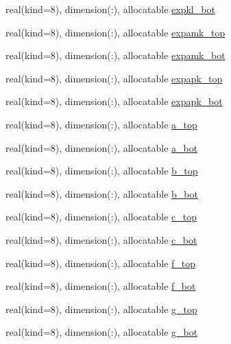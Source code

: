 \begin{DoxyCompactItemize}
\item 
real(kind=8), dimension(\+:), allocatable \hyperlink{namespacecanopy__layer__coms_a97beb2506887f723e41a70d5f75b6a91}{expkl\+\_\+bot}
\item 
real(kind=8), dimension(\+:), allocatable \hyperlink{namespacecanopy__layer__coms_abb449a0f8ffd39c8d2e8f880f6e430ab}{expamk\+\_\+top}
\item 
real(kind=8), dimension(\+:), allocatable \hyperlink{namespacecanopy__layer__coms_a97f0e913b53dc4ee87bae6d9efe52192}{expamk\+\_\+bot}
\item 
real(kind=8), dimension(\+:), allocatable \hyperlink{namespacecanopy__layer__coms_afe005bb965214174ac674496f52449f8}{expapk\+\_\+top}
\item 
real(kind=8), dimension(\+:), allocatable \hyperlink{namespacecanopy__layer__coms_ab65f7a83a69f569d877187dabb799a7d}{expapk\+\_\+bot}
\item 
real(kind=8), dimension(\+:), allocatable \hyperlink{namespacecanopy__layer__coms_acef66a2794edd028cbebb25b81c94582}{a\+\_\+top}
\item 
real(kind=8), dimension(\+:), allocatable \hyperlink{namespacecanopy__layer__coms_a363ffecb6cfbea0e04ccff6048870913}{a\+\_\+bot}
\item 
real(kind=8), dimension(\+:), allocatable \hyperlink{namespacecanopy__layer__coms_af986529a5d36d7c69ccaf9af08e38d1c}{b\+\_\+top}
\item 
real(kind=8), dimension(\+:), allocatable \hyperlink{namespacecanopy__layer__coms_a6d1bef43490e88277ca78abdc845766c}{b\+\_\+bot}
\item 
real(kind=8), dimension(\+:), allocatable \hyperlink{namespacecanopy__layer__coms_a83e6e25d502c4ff6f389c2d353645e5d}{c\+\_\+top}
\item 
real(kind=8), dimension(\+:), allocatable \hyperlink{namespacecanopy__layer__coms_aa62cf8de84772d0d7f4985ccd01ad4c1}{c\+\_\+bot}
\item 
real(kind=8), dimension(\+:), allocatable \hyperlink{namespacecanopy__layer__coms_af3758ee93625e45577879452859992c8}{f\+\_\+top}
\item 
real(kind=8), dimension(\+:), allocatable \hyperlink{namespacecanopy__layer__coms_aa613df56338fc4f6a370134511c4bb50}{f\+\_\+bot}
\item 
real(kind=8), dimension(\+:), allocatable \hyperlink{namespacecanopy__layer__coms_aa7fbffea9917d60f4c6ca5262222c69a}{g\+\_\+top}
\item 
real(kind=8), dimension(\+:), allocatable \hyperlink{namespacecanopy__layer__coms_a29c0519f56906b6f06da139fc1ba16ec}{g\+\_\+bot}

\end{DoxyCompactItemize}
